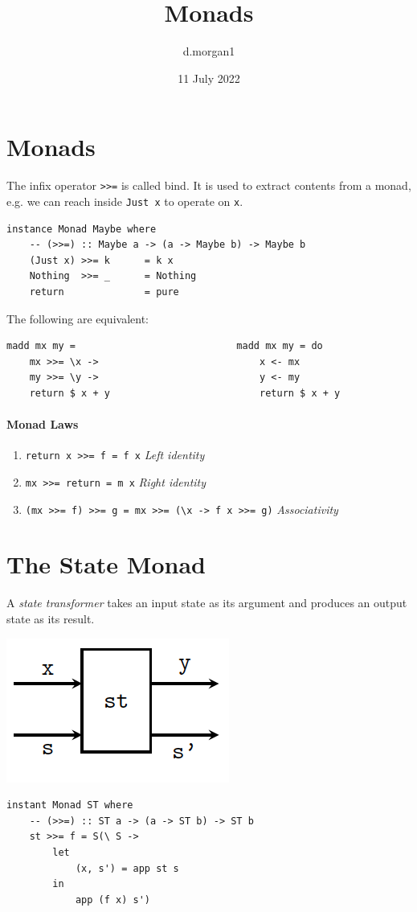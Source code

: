 \documentclass{article}
\title{Monads}
\author{d.morgan1}
\date{11 July 2022}
\begin{document}
\maketitle

\section{Monads}
The infix operator \textcolor{Emerald}{\texttt{>>=}} is called \textcolor{Mulberry}{bind}. It is used to extract contents from a monad, e.g. we can reach inside \textcolor{Emerald}{\texttt{Just x}} to operate on \textcolor{Emerald}{\texttt{x}}.


\begin{verbatim}
instance Monad Maybe where
    -- (>>=) :: Maybe a -> (a -> Maybe b) -> Maybe b
    (Just x) >>= k      = k x
    Nothing  >>= _      = Nothing
    return              = pure
\end{verbatim}
The following are equivalent:
\begin{verbatim}
madd mx my =                            madd mx my = do
    mx >>= \x ->                            x <- mx 
    my >>= \y ->                            y <- my 
    return $ x + y                          return $ x + y
\end{verbatim}
\paragraph{Monad Laws}
\begin{enumerate}
    \item \texttt{return x >>= f    = f x} \textcolor{Mulberry}{\emph{Left identity}}
    \item \texttt{mx >>= return     = m x}
    \textcolor{Mulberry}{\emph{Right identity}}
    \item \texttt{(mx >>= f) >>= g  = mx >>= (\textbackslash x -> f x >>= g)} \textcolor{Mulberry}{\emph{Associativity}}
\end{enumerate}

\section{The State Monad}
A \emph{state transformer} takes an input state as its argument and produces an output state as its result.

\includegraphics[scale=0.5]{images/st.PNG}
\begin{verbatim}
instant Monad ST where 
    -- (>>=) :: ST a -> (a -> ST b) -> ST b
    st >>= f = S(\ S ->
        let 
            (x, s') = app st s 
        in 
            app (f x) s')
\end{verbatim}
\end{document}
